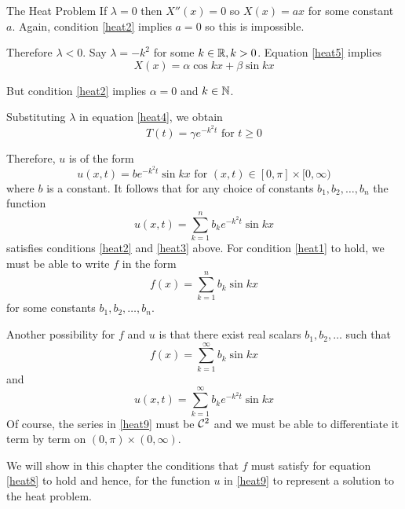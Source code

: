 \begin{section}{The Heat Problem}
If $\lambda = 0$ then $X''(x) = 0$ so $X(x) = ax$
for some constant $a$. Again, condition \ref{heat2}
implies $a = 0$ so this is impossible.

Therefore $\lambda < 0$. Say $\lambda = -k^2$ for some
$k \in \real, k > 0$. Equation \ref{heat5} implies
	\begin{displaymath}
		X(x) = \alpha \cos kx + \beta \sin kx
	\end{displaymath}
	
But condition \ref{heat2} implies $\alpha = 0$ and $k
\in \natrl$.

Substituting $\lambda$ in equation \ref{heat4}, we obtain
	\begin{displaymath}
		T(t) = \gamma e^{-k^2t} \text{ for } t \geq 0
	\end{displaymath}

Therefore, $u$ is of the form
	\begin{displaymath}
		u(x,t) = b e^{-k^2t} \sin kx \text{ for }
			(x,t) \in [0,\pi] \times [0,\infty)
	\end{displaymath}
where $b$ is a constant. It follows that for any
choice of constants $b_1, b_2, \ldots, b_n$ the
function
	\begin{equation}
		u(x,t) = \sum_{k=1}^n b_k e^{-k^2 t} \sin kx
			\label{heat7}
	\end{equation}
satisfies conditions \ref{heat2} and \ref{heat3}
above. For condition \ref{heat1} to hold, we must
be able to write $f$ in the form
	\begin{equation}
		f(x) = \sum_{k=1}^n b_k \sin kx \label{heat6}
	\end{equation}
for some constants $b_1, b_2, \ldots, b_n$.

Another possibility for $f$ and $u$ is that there
exist real scalars $b_1, b_2, \ldots$ such that
	\begin{equation}
		f(x) = \sum_{k=1}^\infty b_k \sin kx \label{heat8}
	\end{equation}
and
	\begin{equation}
		u(x,t) = \sum_{k=1}^\infty b_k e^{-k^2 t} \sin kx
			\label{heat9}
	\end{equation}
Of course, the series in \ref{heat9} must be
$\ctsdiff[2]$ and we must be able to
differentiate it term by term on $(0,\pi) \times (0,\infty)$.

We will show in this chapter the conditions that $f$ must satisfy
for equation \ref{heat8} to hold and hence, for the
function $u$ in \ref{heat9} to represent a solution to
the heat problem.


\end{section}
